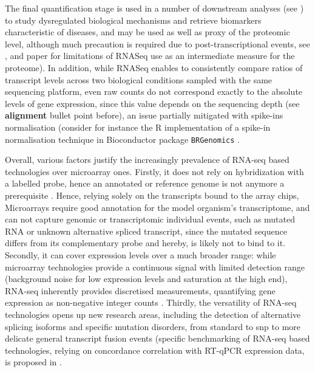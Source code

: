 

The final quantification stage is used in a number of downstream analyses (see ) to study dysregulated biological mechanisms and retrieve biomarkers characteristic of diseases, and may be used as well as proxy of the proteomic level, although much precaution is required due to post-transcriptional events, see ,  and paper \autocite{meissner_etal13} for limitations of RNASeq use as an intermediate measure for the proteome). 
In addition, while RNASeq enables to consistently compare ratios of transcript levels across two biological conditions sampled with the same sequencing platform, even raw counts do not correspond exactly to the absolute levels of gene expression, since this value depends on the sequencing depth (see \textbf{alignment} bullet point before), an issue partially mitigated with \Glspl{spike-in} normalisation (consider for instance the R implementation of a spike-in normalisation technique in Bioconductor package \texttt{BRGenomics} \autocite{deberardine23}.


Overall, various factors justify the increasingly prevalence of RNA-seq based technologies over microarray ones. Firstly, it does not rely on hybridization with a labelled probe, hence an annotated or reference genome is not anymore a prerequisite \autocite{wang_etal09}. Hence, relying solely on the transcripts bound to the array chips, Microarrays require good annotation for the model organism’s transcriptome, and can not capture genomic or transcriptomic individual events, such as mutated RNA or unknown alternative spliced transcript, since the mutated sequence differs from its complementary probe and hereby, is likely not to bind to it. Secondly, it can cover expression levels over a much broader range: while microarray technologies provide a continuous signal with limited detection range (background noise for low expression levels and saturation at the high end), RNA-seq inherently provides discretised measurements, quantifying gene expression as non-negative integer counts \autocite{wilhelm_landry09}. Thirdly, the versatility of RNA-seq technologies opens up new research areas, including the detection of alternative splicing isoforms and specific mutation disorders, from standard to \acrshort{snp} to more delicate general transcript fusion events \autocite{mantione_etal14} (specific benchmarking of RNA-seq based technologies, relying on concordance correlation with RT-qPCR expression data, is proposed in \autocite{everaert_etal17}. 

